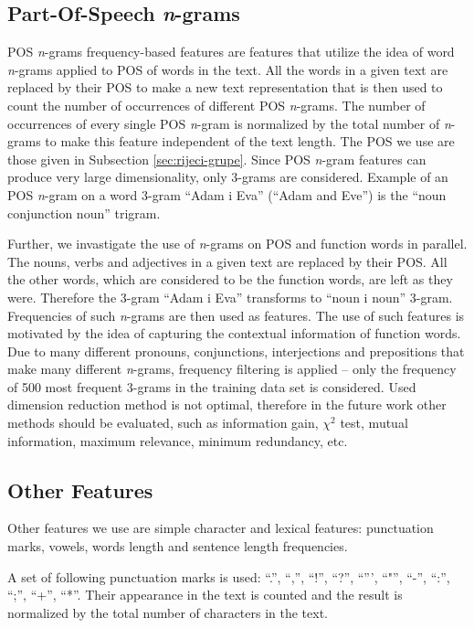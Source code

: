 \documentclass{llncs}
\begin{document}
\subsection{Part-Of-Speech \emph{n}-grams}
\label{sec:ngrami-tipova}
POS \emph{n}-grams frequency-based features are features that utilize the idea of
word \emph{n}-grams applied to POS of words in the text. All the words in a given
text are replaced by their POS to make a new text representation that is then
used to count the number of occurrences of different POS \emph{n}-grams. The
number of occurrences of every single POS \emph{n}-gram is normalized by the
total number of \emph{n}-grams to make this feature independent of the text
length. The POS we use are those given in Subsection \ref{sec:rijeci-grupe}.
Since POS \emph{n}-gram features can produce very large dimensionality, only
3-grams are considered. Example of an POS \emph{n}-gram on a word 3-gram ``Adam i
Eva'' (``Adam and Eve'') is the ``noun conjunction noun'' trigram.

Further, we invastigate the use of \emph{n}-grams on POS and function words in
parallel. The nouns, verbs and adjectives in a given text are replaced by their
POS. All the other words, which are considered to be the function words, are
left as they were. Therefore the 3-gram ``Adam i Eva'' transforms to ``noun i
noun'' 3-gram. Frequencies of such \emph{n}-grams are then used as features.
The use of such features is motivated by the idea of capturing the contextual
information of function words. Due to many different pronouns, conjunctions,
interjections and prepositions that make many different \emph{n}-grams, frequency
filtering is applied -- only the frequency of 500 most frequent 3-grams in the
training data set is considered. Used dimension reduction method is not optimal,
therefore in the future work other methods should be evaluated, such as
information gain, $\chi^2$ test, mutual information, maximum relevance, minimum
redundancy, etc.

\subsection{Other Features}
\label{sec:znacajke-manje}
Other features we use are simple character and lexical features:
punctuation marks, vowels, words length and sentence length frequencies.

A set of following punctuation marks is used: ``.'', ``,'', ``!'', ``?'',
``''', ``"'', ``-'', ``:'', ``;'', ``+'', ``*''. Their appearance in the text is counted and
the result is normalized by the total number of characters in the text. 
\end{document}
